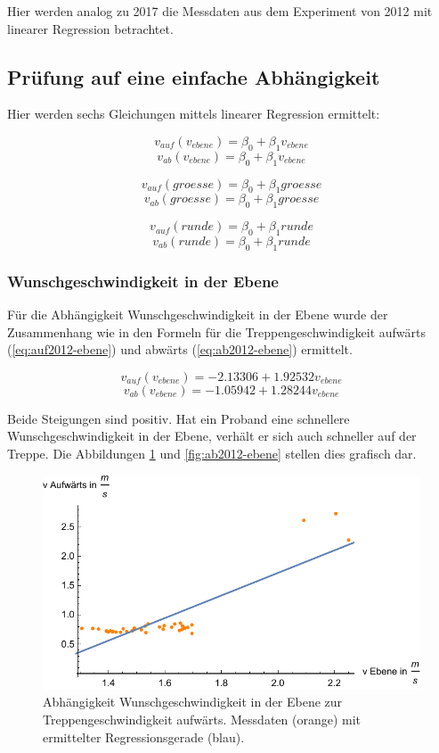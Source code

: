 
Hier werden analog zu 2017 die Messdaten aus dem Experiment von 2012 mit linearer Regression betrachtet.

\subsection{Prüfung auf eine einfache Abhängigkeit}

Hier werden sechs Gleichungen mittels linearer Regression ermittelt: 

\[v_{auf}(v_{ebene}) = \beta_0 + \beta_1 v_{ebene}\]
\[v_{ab}(v_{ebene}) = \beta_0 + \beta_1 v_{ebene}\]

\[v_{auf}(groesse) = \beta_0 + \beta_1 groesse\]
\[v_{ab}(groesse) = \beta_0 + \beta_1 groesse\]

\[v_{auf}(runde) = \beta_0 + \beta_1 runde\]
\[v_{ab}(runde) = \beta_0 + \beta_1 runde\]

\subsubsection{Wunschgeschwindigkeit in der Ebene}

Für die Abhängigkeit Wunschgeschwindigkeit in der Ebene wurde 
der Zusammenhang wie in den Formeln für die Treppengeschwindigkeit aufwärts (\ref{eq:auf2012-ebene}) und abwärts (\ref{eq:ab2012-ebene}) ermittelt. 

\begin{equation} \label{eq:auf2012-ebene}
	v_{auf}(v_{ebene}) = -2.13306 + 1.92532 v_{ebene}
\end{equation}
\begin{equation} \label{eq:ab2012-ebene}
	v_{ab}(v_{ebene}) = -1.05942 + 1.28244 v_{ebene}
\end{equation}

Beide Steigungen sind positiv. Hat ein Proband eine schnellere Wunschgeschwindigkeit in der Ebene, verhält er sich auch schneller auf 
der Treppe. Die Abbildungen \ref{fig:auf2012-ebene} und \ref{fig:ab2012-ebene}
stellen dies grafisch dar. 

\begin{figure} \centering 
	\includegraphics[]{abbildungen/regression/2012/auf-ebene.pdf}
	
	\caption{Abhängigkeit Wunschgeschwindigkeit in der Ebene zur Treppengeschwindigkeit aufwärts. Messdaten (orange) mit ermittelter Regressionsgerade (blau). \label{fig:auf2012-ebene}}
\end{figure}

